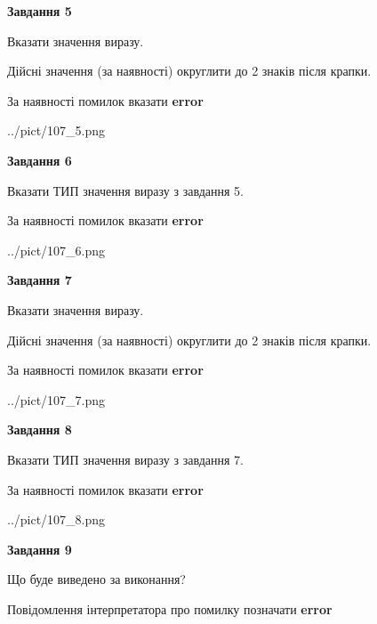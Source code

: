 \documentclass[11pt, ukrainian]{article}
\begin{document}
{\begin {large}
{\begin {center}\textbf{Завдання 5}\end {center}}\par
Вказати значення виразу. \par
Дійсні значення (за наявності) округлити до 2 знаків після крапки. \par
За наявності помилок вказати \textbf{error}

\begin{center}
	{../pict/107_5.png}
\end{center}
\newpage

{\begin {center}\textbf{Завдання 6}\end {center}}\par
Вказати ТИП значення виразу з завдання 5. \par
За наявності помилок вказати \textbf{error}

\begin{center}
	{../pict/107_6.png}
\end{center}
\newpage

{\begin {center}\textbf{Завдання 7}\end {center}}\par
Вказати значення виразу. \par
Дійсні значення (за наявності) округлити до 2 знаків після крапки. \par
За наявності помилок вказати \textbf{error}

\begin{center}
	{../pict/107_7.png}
\end{center}
\newpage

{\begin {center}\textbf{Завдання 8}\end {center}}\par
Вказати ТИП значення виразу з завдання 7. \par
За наявності помилок вказати \textbf{error}

\begin{center}
	{../pict/107_8.png}
\end{center}
\newpage

{\begin {center}\textbf{Завдання 9}\end {center}}\par
Що буде виведено за виконання? \par
Повідомлення інтерпретатора про помилку позначати \textbf{error}


\end{large}}
\end{document}
